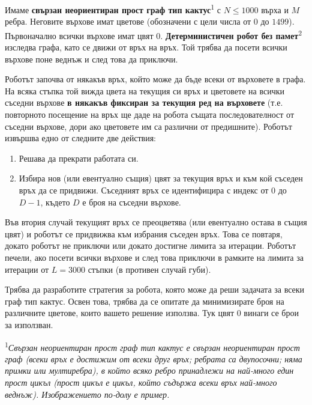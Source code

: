 \documentclass[12pt]{article}
\begin{document}
\renewcommand{\round}{Ден 2}
\renewcommand{\problemName}{Задача Навигации}
\renewcommand{\lang}{Български}

\renewcommand{\tl}{$3$ sec.}
\renewcommand{\ml}{$512$ MB}
\problem{\problemName}

Имаме \textbf{свързан неориентиран прост граф тип кактус}\textsuperscript{1} с $N \leq 1000$ върха и $M$ ребра. Неговите върхове имат цветове (обозначени с цели числа от $0$ до $1499$). Първоначално всички върхове имат цвят $0$. \textbf{Детерминистичен робот без памет}\textsuperscript{2} изследва графа, като се движи от връх на връх. Той трябва да посети всички върхове поне веднъж и след това да приключи.

Роботът започва от някакъв връх, който може да бъде всеки от върховете в графа. На всяка стъпка той вижда цвета на текущия си връх и цветовете на всички съседни върхове \textbf{в някакъв фиксиран за текущия ред на върховете} (т.е. повторното посещение на връх ще даде на робота същата последователност от съседни върхове, дори ако цветовете им са различни от предишните). Роботът извършва едно от следните две действия:
\begin{enumerate}
\item Решава да прекрати работата си.
\item Избира нов (или евентуално същия) цвят за текущия връх и към кой съседен връх да се придвижи. Съседният връх се идентифицира с индекс от $0$ до $D-1$, където $D$ е броя на съседни върхове.
\end{enumerate}

Във втория случай текущият връх се преоцветява (или евентуално остава в същия цвят) и роботът се придвижва към избрания съседен връх. Това се повтаря, докато роботът не приключи или докато достигне лимита за итерации. Роботът печели, ако посети всички върхове и след това приключи в рамките на лимита за итерации от $L = 3000$ стъпки (в противен случай губи).

Трябва да разработите стратегия за робота, която може да реши задачата за всеки граф тип кактус. Освен това, трябва да се опитате да минимизирате броя на различните цветове, които вашето решение използва. Тук цвят $0$ винаги се брои за използван.

\textsuperscript{1}\textit{Свързан неориентиран прост граф тип кактус е свързан неориентиран прост граф (всеки връх е достижим от всеки друг връх; ребрата са двупосочни; няма примки или мултиребра), в който всяко ребро принадлежи на най-много един прост цикъл (прост цикъл е цикъл, който съдържа всеки връх най-много веднъж). Изображението по-долу е пример.}
\end{document}
